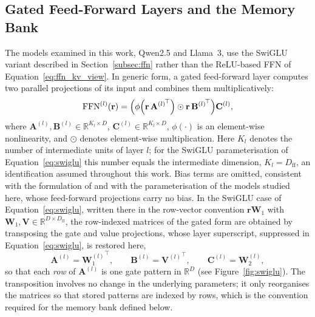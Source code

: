 \subsection{Gated Feed-Forward Layers and the Memory Bank}
\label{subsec:gated_ffn_memory}
The models examined in this work, Qwen2.5 and Llama~3, use the SwiGLU variant
described in Section~\ref{subsec:ffn} rather than the ReLU-based FFN of
Equation~\eqref{eq:ffn_kv_view}. In generic form, a gated feed-forward layer
computes two parallel projections of its input and combines them
multiplicatively:
\begin{equation}
    \mathrm{FFN}^{(l)}(\mathbf{r})
    =
    \Bigl(
        \phi\!\left(\mathbf{r}\,{\mathbf{A}^{(l)}}^{\!\top}\right)
        \odot
        \mathbf{r}\,{\mathbf{B}^{(l)}}^{\!\top}
    \Bigr)\mathbf{C}^{(l)},
    \label{eq:gated_ffn_generic}
\end{equation}
where $\mathbf{A}^{(l)}, \mathbf{B}^{(l)} \in \mathbb{R}^{K_l \times D}$,
$\mathbf{C}^{(l)} \in \mathbb{R}^{K_l \times D}$, $\phi(\cdot)$ is an
element-wise nonlinearity, and $\odot$ denotes element-wise multiplication.
Here $K_l$ denotes the number of intermediate units of layer $l$; for the
SwiGLU parameterisation of Equation~\eqref{eq:swiglu} this number equals the
intermediate dimension, $K_l = D_{\mathrm{ff}}$, an identification assumed
throughout this work. Bias terms are omitted, consistent with the formulation
of \citet{shazeer2020glu} and with the parameterisation of the models studied
here, whose feed-forward projections carry no bias. In the SwiGLU case of
Equation~\eqref{eq:swiglu}, written there in the row-vector convention
$\mathbf{r}\mathbf{W}_1$ with $\mathbf{W}_1, \mathbf{V} \in
\mathbb{R}^{D \times D_{\mathrm{ff}}}$, the row-indexed matrices of the gated
form are obtained by transposing the gate and value projections, whose layer
superscript, suppressed in Equation~\eqref{eq:swiglu}, is restored here,
\begin{equation}
    \mathbf{A}^{(l)} = {\mathbf{W}_1^{(l)}}^{\!\top}, \qquad
    \mathbf{B}^{(l)} = {\mathbf{V}^{(l)}}^{\!\top}, \qquad
    \mathbf{C}^{(l)} = \mathbf{W}_2^{(l)},
    \label{eq:gated_identification}
\end{equation}
so that each \emph{row} of $\mathbf{A}^{(l)}$ is one gate pattern in
$\mathbb{R}^D$ (see Figure~\ref{fig:swiglu}). The transposition involves no
change in the underlying parameters; it only reorganises the matrices so that
stored patterns are indexed by rows, which is the convention required for the
memory bank defined below.

